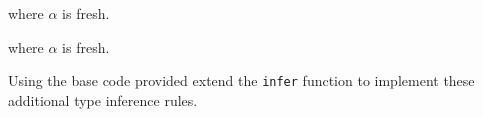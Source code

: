 \documentclass[11pt]{article}
\begin{document}
where $\alpha$ is fresh. \vspace{.5em}

where $\alpha$ is fresh. \vspace{.5em}


\begin{exercise}
Using the base code provided extend the {\tt{infer}} function to implement
these additional type inference rules.
\end{exercise}
\end{document}

